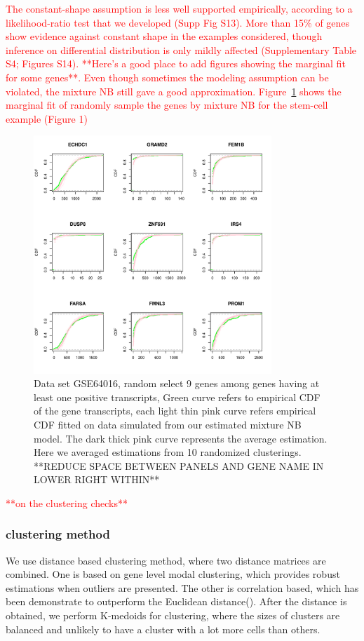 \documentclass[aoas,preprint]{imsart}
\begin{document}
\textcolor{red}{The constant-shape assumption is less well supported empirically, according to 
a likelihood-ratio test that we developed (Supp Fig S13).  More than 15\% of genes show 
evidence against constant shape in the examples considered, though inference on differential
distribution is only mildly affected  (Supplementary Table S4; Figures S14).  **Here's a good
place to add figures showing the marginal fit for some genes**. 
Even though sometimes the modeling assumption can be violated, the mixture NB still gave a good approximation. 
Figure~\ref{fig:cdf} shows the marginal fit of randomly sample the genes by mixture NB for the stem-cell example (Figure 1) }

\begin{figure}[h]
\includegraphics[width = 0.8\textwidth]{Figs/ecdf.pdf}
\caption{Data set GSE64016, random select 9 genes among genes having at least one positive transcripts, Green curve refers to empirical CDF of the gene transcripts, each light thin pink curve refers empirical CDF fitted on data simulated from our estimated mixture NB model. The dark thick pink curve represents the average estimation. Here we averaged estimations from 10 randomized clusterings. **REDUCE SPACE BETWEEN PANELS AND GENE NAME IN LOWER RIGHT WITHIN**}
\label{fig:cdf}
\end{figure}

\textcolor{red}{**on the clustering checks**}




\subsubsection{clustering method}
We use distance based clustering method, where two distance matrices are combined. 
One is based on gene level modal clustering, which provides robust estimations when outliers are presented. 
The other is correlation based, which has been demonstrate to outperform the Euclidean distance(\cite{Kim:2018}).
After the distance is obtained, we perform K-medoids for clustering, where the sizes of clusters are balanced and unlikely to have a cluster with a lot more cells than others.
\end{document}
